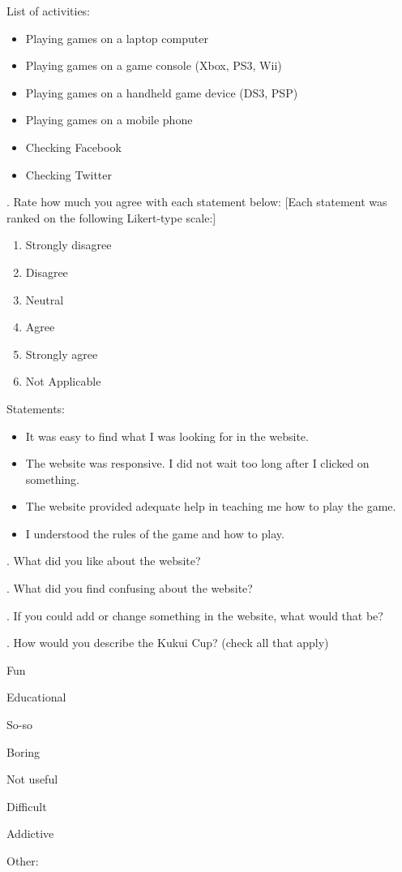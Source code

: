 \noindent
List of activities:
\begin{itemize}
	\item Playing games on a laptop computer
	\item Playing games on a game console (Xbox, PS3, Wii)
	\item Playing games on a handheld game device (DS3, PSP)
	\item Playing games on a mobile phone
	\item Checking Facebook
	\item Checking Twitter
\end{itemize}

. Rate how much you agree with each statement below: [Each statement was ranked on the following Likert-type scale:]
\begin{enumerate}
	\item Strongly disagree
	\item Disagree
	\item Neutral
	\item Agree
	\item Strongly agree
	\item Not Applicable
\end{enumerate}

\noindent
Statements:
\begin{itemize}
	\item It was easy to find what I was looking for in the website.
	\item The website was responsive. I did not wait too long after I clicked on something.
	\item The website provided adequate help in teaching me how to play the game.
	\item I understood the rules of the game and how to play.
\end{itemize}

. What did you like about the website?

. What did you find confusing about the website?

. If you could add or change something in the website, what would that be?


. How would you describe the Kukui Cup? (check all that apply)
\begin{checkbox}
	\item Fun
	\item Educational
	\item So-so
	\item Boring
	\item Not useful
	\item Difficult
	\item Addictive
	\item Other: \underline{\hspace{5cm}}
\end{checkbox}

